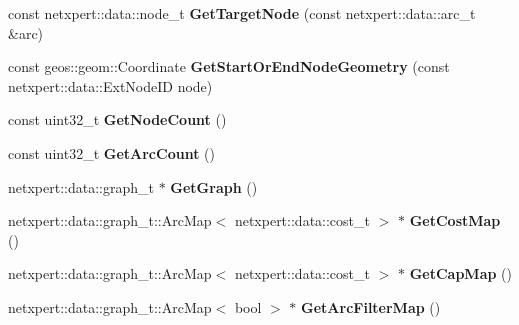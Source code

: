 \begin{DoxyCompactItemize}
\item 
const netxpert\+::data\+::node\+\_\+t {\bfseries Get\+Target\+Node} (const netxpert\+::data\+::arc\+\_\+t \&arc)\hypertarget{classnetxpert_1_1InternalNet_a618cfe702e2f447cda78dd4384979e23}{}\label{classnetxpert_1_1InternalNet_a618cfe702e2f447cda78dd4384979e23}

\item 
const geos\+::geom\+::\+Coordinate {\bfseries Get\+Start\+Or\+End\+Node\+Geometry} (const netxpert\+::data\+::\+Ext\+Node\+ID node)\hypertarget{classnetxpert_1_1InternalNet_ab0223b625c6a03a4e7dfaee4f6efa609}{}\label{classnetxpert_1_1InternalNet_ab0223b625c6a03a4e7dfaee4f6efa609}

\item 
const uint32\+\_\+t {\bfseries Get\+Node\+Count} ()\hypertarget{classnetxpert_1_1InternalNet_a8c6cc549cc2bb8596e0ca9090cbdfdd4}{}\label{classnetxpert_1_1InternalNet_a8c6cc549cc2bb8596e0ca9090cbdfdd4}

\item 
const uint32\+\_\+t {\bfseries Get\+Arc\+Count} ()\hypertarget{classnetxpert_1_1InternalNet_aeef27800e7f0bda9ef518d8e4273fea7}{}\label{classnetxpert_1_1InternalNet_aeef27800e7f0bda9ef518d8e4273fea7}

\item 
netxpert\+::data\+::graph\+\_\+t $\ast$ {\bfseries Get\+Graph} ()\hypertarget{classnetxpert_1_1InternalNet_a67d06885a857c73c755a562ec6389ba5}{}\label{classnetxpert_1_1InternalNet_a67d06885a857c73c755a562ec6389ba5}

\item 
netxpert\+::data\+::graph\+\_\+t\+::\+Arc\+Map$<$ netxpert\+::data\+::cost\+\_\+t $>$ $\ast$ {\bfseries Get\+Cost\+Map} ()\hypertarget{classnetxpert_1_1InternalNet_a4630bcae97db4d4f14969c27df504f3f}{}\label{classnetxpert_1_1InternalNet_a4630bcae97db4d4f14969c27df504f3f}

\item 
netxpert\+::data\+::graph\+\_\+t\+::\+Arc\+Map$<$ netxpert\+::data\+::cost\+\_\+t $>$ $\ast$ {\bfseries Get\+Cap\+Map} ()\hypertarget{classnetxpert_1_1InternalNet_af70f905904597c8ff70e74c743406234}{}\label{classnetxpert_1_1InternalNet_af70f905904597c8ff70e74c743406234}

\item 
netxpert\+::data\+::graph\+\_\+t\+::\+Arc\+Map$<$ bool $>$ $\ast$ {\bfseries Get\+Arc\+Filter\+Map} ()\hypertarget{classnetxpert_1_1InternalNet_a20e628e1ff1dc6b576ab94df4681995d}{}\label{classnetxpert_1_1InternalNet_a20e628e1ff1dc6b576ab94df4681995d}


\end{DoxyCompactItemize}
